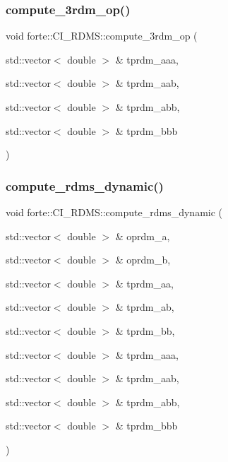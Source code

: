 \subsubsection{\texorpdfstring{compute\+\_\+3rdm\+\_\+op()}{compute\_3rdm\_op()}}
{\footnotesize\ttfamily void forte\+::\+C\+I\+\_\+\+R\+D\+M\+S\+::compute\+\_\+3rdm\+\_\+op (\begin{DoxyParamCaption}\item[{std\+::vector$<$ double $>$ \&}]{tprdm\+\_\+aaa,  }\item[{std\+::vector$<$ double $>$ \&}]{tprdm\+\_\+aab,  }\item[{std\+::vector$<$ double $>$ \&}]{tprdm\+\_\+abb,  }\item[{std\+::vector$<$ double $>$ \&}]{tprdm\+\_\+bbb }\end{DoxyParamCaption})}

\mbox{\label{classforte_1_1_c_i___r_d_m_s_abd29572a50f93000b682234ffa832224}} 
\subsubsection{\texorpdfstring{compute\+\_\+rdms\+\_\+dynamic()}{compute\_rdms\_dynamic()}}
{\footnotesize\ttfamily void forte\+::\+C\+I\+\_\+\+R\+D\+M\+S\+::compute\+\_\+rdms\+\_\+dynamic (\begin{DoxyParamCaption}\item[{std\+::vector$<$ double $>$ \&}]{oprdm\+\_\+a,  }\item[{std\+::vector$<$ double $>$ \&}]{oprdm\+\_\+b,  }\item[{std\+::vector$<$ double $>$ \&}]{tprdm\+\_\+aa,  }\item[{std\+::vector$<$ double $>$ \&}]{tprdm\+\_\+ab,  }\item[{std\+::vector$<$ double $>$ \&}]{tprdm\+\_\+bb,  }\item[{std\+::vector$<$ double $>$ \&}]{tprdm\+\_\+aaa,  }\item[{std\+::vector$<$ double $>$ \&}]{tprdm\+\_\+aab,  }\item[{std\+::vector$<$ double $>$ \&}]{tprdm\+\_\+abb,  }\item[{std\+::vector$<$ double $>$ \&}]{tprdm\+\_\+bbb }\end{DoxyParamCaption})}

